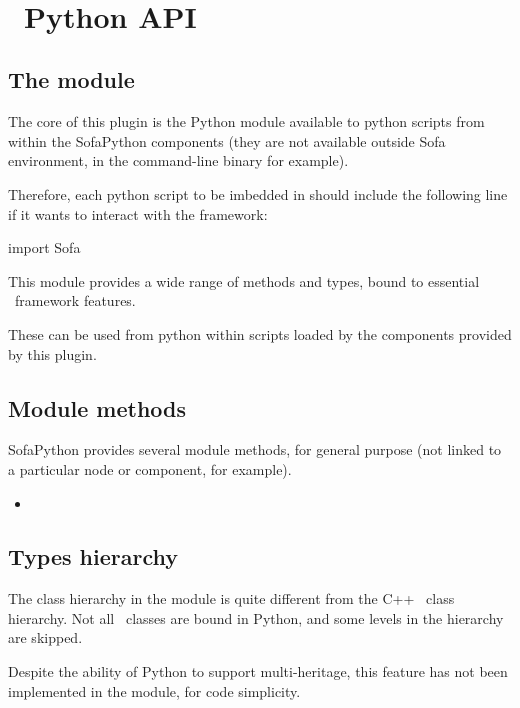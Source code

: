\

\section{\sofa \ Python API}

\subsection{The  module}

The core of this plugin is the  Python module available to python scripts from within the SofaPython components (they are not available outside Sofa environment, in the command-line  binary for example).

Therefore, each python script to be imbedded in \sofa should include the following line if it wants to interact with the \sofa framework:

\begin{code_python}
import Sofa
\end{code_python}

This module provides a wide range of methods and types, bound to essential \sofa \ framework features.

These can be used from python within scripts loaded by the components provided by this plugin.

\subsection{Module methods}

SofaPython provides several module methods, for general purpose (not linked to a particular node or component, for example).

\begin{itemize}
\item {} 
\end{itemize}

\subsection{Types hierarchy}

The class hierarchy in the  module is quite different from the C++ \sofa \ class hierarchy. Not all \sofa \ classes are bound in Python, and some levels in the hierarchy are skipped.

Despite the ability of Python to support multi-heritage, this feature has not been implemented in the  module, for code simplicity.


